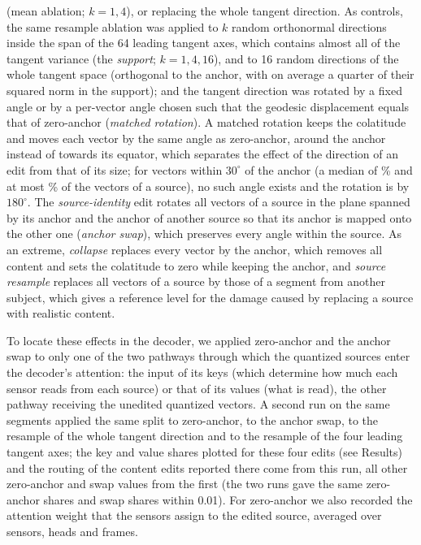 \documentclass[10pt,letterpaper]{article}
\begin{document}
(mean ablation; $k=1,4$), or replacing the whole tangent direction. As controls, the same resample ablation was applied to $k$ random
orthonormal directions inside the span of the 64 leading tangent axes, which contains almost
all of the tangent variance (the \emph{support}; $k=1,4,16$), and to 16 random directions of
the whole tangent space (orthogonal to the anchor, with on average a quarter of their squared
norm in the support); and the tangent direction was rotated by a fixed angle or by a per-vector
angle chosen such that the geodesic displacement equals that of zero-anchor (\emph{matched
rotation}). A matched rotation keeps the colatitude and moves each vector by the same angle as
zero-anchor, around the anchor instead of towards its equator, which separates the effect of
the direction of an edit from that of its size; for vectors within $30^\circ$ of the anchor
(a median of \WithinThirtyMedianPct\% and at most \WithinThirtyMaxPct\% of the vectors of a
source), no such angle exists and the rotation is by $180^\circ$. The \emph{source-identity}
edit rotates all vectors of a source in the plane spanned by its anchor and the anchor of
another source so that its anchor is mapped onto the other one (\emph{anchor swap}), which
preserves every angle within the source. As an extreme, \emph{collapse} replaces every vector
by the anchor, which removes all content and sets the colatitude to zero while keeping the anchor, and \emph{source resample}
replaces all vectors of a source by those of a segment from another subject, which gives a
reference level for the damage caused by replacing a source with realistic content.




To locate these effects in the decoder, we applied zero-anchor and the anchor swap to only
one of the two pathways through which the quantized sources enter the decoder's attention:
the input of its keys (which determine how much each sensor reads from each source) or that of
its values (what is read), the other pathway receiving the unedited quantized vectors. A second
run on the same segments applied the same split to zero-anchor, to the anchor swap, to the
resample of the whole tangent direction and to the resample of the four leading tangent axes; the
key and value shares plotted for these four edits (see Results) and the routing of the
content edits reported there come from this run, all other zero-anchor and swap values from the first (the
two runs gave the same zero-anchor shares and swap shares within 0.01). For
zero-anchor we also recorded the attention weight that the sensors assign to the edited source,
averaged over sensors, heads and frames.
\end{document}
